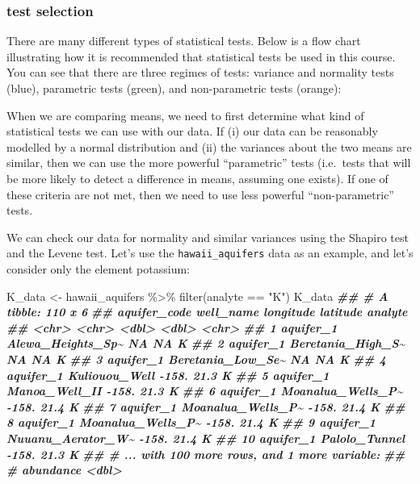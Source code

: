 \documentclass[
]{krantz}
\newenvironment{Shaded}{\begin{snugshade}}{\end{snugshade}}
\newcommand{\DocumentationTok}[1]{\textcolor[rgb]{0.56,0.35,0.01}{\textbf{\textit{#1}}}}
\newcommand{\FunctionTok}[1]{\textcolor[rgb]{0.00,0.00,0.00}{#1}}
\newcommand{\NormalTok}[1]{#1}
\newcommand{\OtherTok}[1]{\textcolor[rgb]{0.56,0.35,0.01}{#1}}
\newcommand{\SpecialCharTok}[1]{\textcolor[rgb]{0.00,0.00,0.00}{#1}}
\newcommand{\StringTok}[1]{\textcolor[rgb]{0.31,0.60,0.02}{#1}}
\begin{document}
\hypertarget{test-selection}{%
\subsubsection{test selection}\label{test-selection}}

There are many different types of statistical tests. Below is a flow chart illustrating how it is recommended that statistical tests be used in this course. You can see that there are three regimes of tests: variance and normality tests (blue), parametric tests (green), and non-parametric tests (orange):

When we are comparing means, we need to first determine what kind of statistical tests we can use with our data. If (i) our data can be reasonably modelled by a normal distribution and (ii) the variances about the two means are similar, then we can use the more powerful ``parametric'' tests (i.e.~tests that will be more likely to detect a difference in means, assuming one exists). If one of these criteria are not met, then we need to use less powerful ``non-parametric'' tests.

We can check our data for normality and similar variances using the Shapiro test and the Levene test. Let's use the \texttt{hawaii\_aquifers} data as an example, and let's consider only the element potassium:

\begin{Shaded}
\begin{Highlighting}[]
\NormalTok{K\_data }\OtherTok{\textless{}{-}}\NormalTok{ hawaii\_aquifers }\SpecialCharTok{\%\textgreater{}\%}
  \FunctionTok{filter}\NormalTok{(analyte }\SpecialCharTok{==} \StringTok{"K"}\NormalTok{)}
\NormalTok{  K\_data}
\DocumentationTok{\#\# \# A tibble: 110 x 6}
\DocumentationTok{\#\#    aquifer\_code well\_name         longitude latitude analyte}
\DocumentationTok{\#\#    \textless{}chr\textgreater{}        \textless{}chr\textgreater{}                 \textless{}dbl\textgreater{}    \textless{}dbl\textgreater{} \textless{}chr\textgreater{}  }
\DocumentationTok{\#\#  1 aquifer\_1    Alewa\_Heights\_Sp\textasciitilde{}       NA      NA   K      }
\DocumentationTok{\#\#  2 aquifer\_1    Beretania\_High\_S\textasciitilde{}       NA      NA   K      }
\DocumentationTok{\#\#  3 aquifer\_1    Beretania\_Low\_Se\textasciitilde{}       NA      NA   K      }
\DocumentationTok{\#\#  4 aquifer\_1    Kuliouou\_Well         {-}158.     21.3 K      }
\DocumentationTok{\#\#  5 aquifer\_1    Manoa\_Well\_II         {-}158.     21.3 K      }
\DocumentationTok{\#\#  6 aquifer\_1    Moanalua\_Wells\_P\textasciitilde{}     {-}158.     21.4 K      }
\DocumentationTok{\#\#  7 aquifer\_1    Moanalua\_Wells\_P\textasciitilde{}     {-}158.     21.4 K      }
\DocumentationTok{\#\#  8 aquifer\_1    Moanalua\_Wells\_P\textasciitilde{}     {-}158.     21.4 K      }
\DocumentationTok{\#\#  9 aquifer\_1    Nuuanu\_Aerator\_W\textasciitilde{}     {-}158.     21.4 K      }
\DocumentationTok{\#\# 10 aquifer\_1    Palolo\_Tunnel         {-}158.     21.3 K      }
\DocumentationTok{\#\# \# ... with 100 more rows, and 1 more variable:}
\DocumentationTok{\#\# \#   abundance \textless{}dbl\textgreater{}}
\end{Highlighting}
\end{Shaded}
\end{document}
